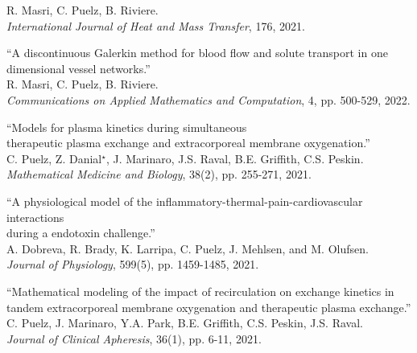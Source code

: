 \documentclass{article} %
\begin{document}
\begin{etaremune}
R. Masri, C. Puelz, B. Riviere. \\
{\em International Journal of Heat and Mass Transfer}, 176, 2021.
\item ``A discontinuous Galerkin method for blood flow and solute transport in one dimensional vessel networks.'' \\
R. Masri, C. Puelz, B. Riviere. \\
{\em Communications on Applied Mathematics and Computation}, 4, pp. 500-529, 2022.
\item ``Models for plasma kinetics during simultaneous \\therapeutic plasma exchange and extracorporeal membrane oxygenation.'' \\
C. Puelz, Z. Danial$^\star$, J. Marinaro, J.S. Raval, B.E. Griffith, C.S. Peskin. \\ {\em Mathematical Medicine and Biology}, 38(2), pp. 255-271, 2021. 
\item ``A physiological model of the inflammatory-thermal-pain-cardiovascular interactions \\during a endotoxin challenge.''\\
 A. Dobreva, R. Brady, K. Larripa, C. Puelz, J. Mehlsen, and M. Olufsen. \\
{\em Journal of Physiology}, 599(5), pp. 1459-1485, 2021.
\item ``Mathematical modeling of the impact of recirculation on exchange kinetics in tandem extracorporeal membrane oxygenation and therapeutic plasma exchange.'' \\ 
C. Puelz, J. Marinaro, Y.A. Park, B.E. Griffith, C.S. Peskin, J.S. Raval.\\ 
{\em Journal of Clinical Apheresis}, 36(1), pp. 6-11, 2021.


\end{etaremune}
\end{document}
